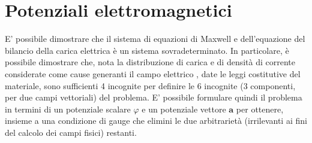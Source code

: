 \documentclass[letterpaper,10pt,english]{jupyterBook}
\begin{document}
\chapter{Potenziali elettromagnetici}
\label{\detokenize{ch/potentials:potenziali-elettromagnetici}}\label{\detokenize{ch/potentials:classical-electromagnetism-potentials}}\label{\detokenize{ch/potentials::doc}}
\sphinxAtStartPar
E’ possibile dimostrare che il sistema di equazioni di Maxwell e dell’equazione del bilancio della carica elettrica è un sistema sovra\sphinxhyphen{}determinato.
In particolare, è possibile dimostrare che, nota la distribuzione di carica e di densità di corrente \sphinxhyphen{} considerate come cause generanti il campo elettrico \sphinxhyphen{}, date le leggi costitutive del materiale, sono sufficienti 4 incognite per definire le 6 incognite (3 componenti, per due campi vettoriali) del problema.
E’ possibile formulare quindi il problema in termini di un potenziale scalare \(\varphi\) e un potenziale vettore \(\mathbf{a}\) per ottenere, insieme a una condizione di gauge che elimini le due arbitrarietà (irrilevanti ai fini del calcolo dei campi fisici) restanti.
\end{document}
